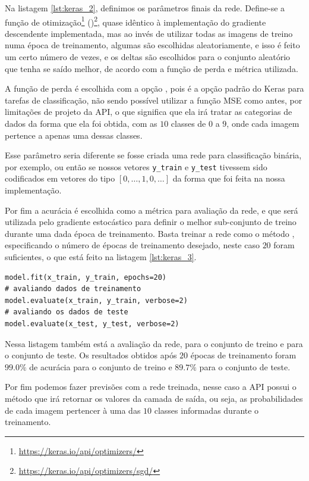 Na listagem \ref{lst:keras_2}, definimos os parâmetros finais da rede. Define-se a função de otimização\footnote{\url{https://keras.io/api/optimizers/}}  ()\footnote{\url{https://keras.io/api/optimizers/sgd/}}, quase idêntico à implementação do gradiente descendente implementada, mas ao invés de utilizar todas as imagens de treino numa época de treinamento, algumas são escolhidas aleatoriamente, e isso é feito um certo número de vezes, e os deltas são escolhidos para o conjunto aleatório que tenha se saído melhor, de acordo com a função de perda e métrica utilizada.

A função de perda é escolhida com a opção , pois é a opção padrão do Keras para tarefas de classificação, não sendo possível utilizar a função MSE como antes, por limitações de projeto da API, o que significa que ela irá tratar as categorias de dados da forma que ela foi obtida, com as $10$ classes de $0$ a $9$, onde cada imagem pertence a apenas uma dessas classes. 

Esse parâmetro seria diferente se fosse criada uma rede para classificação binária, por exemplo, ou então se nossos vetores \texttt{y\_train} e \texttt{y\_test} tivessem sido codificados em vetores do tipo $[0,\ldots,1,0,\ldots]$ da forma que foi feita na nossa implementação.

Por fim a acurácia é escolhida como a métrica para avaliação da rede, e que será utilizada pelo gradiente estocástico para definir o melhor sub-conjunto de treino durante uma dada época de treinamento. Basta treinar a rede como o método , especificando o número de épocas de treinamento desejado, neste caso $20$ foram suficientes, o que está feito na listagem \ref{lst:keras_3}.
\newline
\estiloR
\begin{lstlisting}[caption={Trecho do script \eng{mnist\_keras.py}},label={lst:keras_3},escapeinside={\%}]
model.fit(x_train, y_train, epochs=20)
# avaliando dados de treinamento
model.evaluate(x_train, y_train, verbose=2)
# avaliando os dados de teste
model.evaluate(x_test, y_test, verbose=2)
\end{lstlisting}


Nessa listagem também está a avaliação da rede, para o conjunto de treino e para o conjunto de teste. Os resultados obtidos após $20$ épocas de treinamento foram $99.0\%$ de acurácia para o conjunto de treino e $89.7\%$ para o conjunto de teste. 

Por fim podemos fazer previsões com a rede treinada, nesse caso a API possui o método  que irá retornar os valores da camada de saída, ou seja, as probabilidades de cada imagem pertencer à uma das $10$ classes informadas durante o treinamento.

